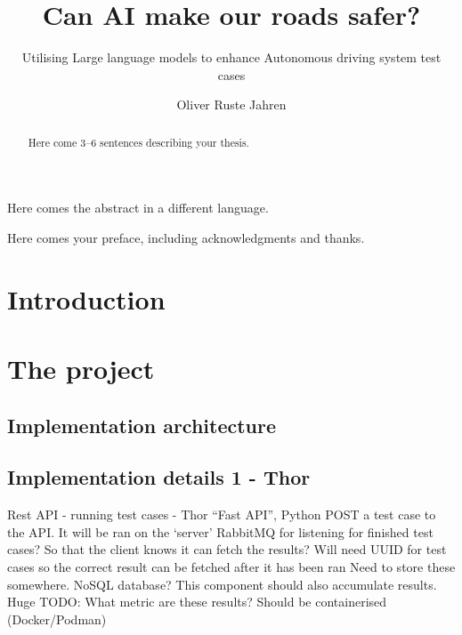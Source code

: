 \documentclass[UKenglish]{uiomasterthesis}  %
\title{Can AI make our roads safer?}
\subtitle{Utilising Large language models to enhance Autonomous driving system test cases}
\author{Oliver Ruste Jahren}
\begin{document}
\uiomasterfp[dept={Department of Informatics},
  program={Informatics: Programming and Systems architecture},
  supervisor={Shaukat Ali \and Karoline Nylænder},
  info={Simula Research Laboratory},
  date={Fall 2025},
  long]

\frontmatter{}
\begin{abstract}
  Here come 3--6 sentences describing your thesis.
\end{abstract}

\begin{xabstract}[Sammendrag]
  Here comes the abstract in a different language.
\end{xabstract}

\tableofcontents{}
\listoffigures{}                            %

\begin{preface}
  Here comes your preface, including acknowledgments and thanks.
\end{preface}

\mainmatter{}
\part{Introduction}





\part{The project}



\chapter{Implementation architecture}
\chapter{Implementation details 1 - Thor}

Rest API - running test cases - Thor
“Fast API”, Python
POST a test case to the API. It will be ran on the ‘server’
RabbitMQ for listening for finished test cases? So that the client knows it can fetch the results?
Will need UUID for test cases so the correct result can be fetched after it has been ran
Need to store these somewhere. NoSQL database?
This component should also accumulate results.
Huge TODO: What metric are these results?
Should be containerised (Docker/Podman)
\end{document}
